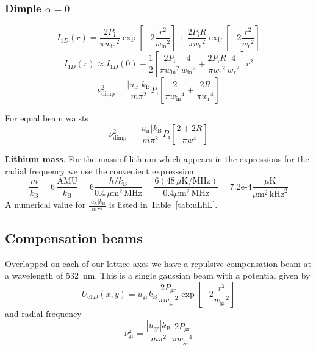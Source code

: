 \documentclass[11pt,letter]{article}
\newcommand{\pin}{\ensuremath{ P_{\text{i}}} }
\newcommand{\win}{\ensuremath{ w_{\text{in}}} }
\newcommand{\wret}{\ensuremath{ w_{\text{r}}} }
\newcommand{\pgr}{\ensuremath{ P_{\text{gr}}} }
\newcommand{\wgr}{\ensuremath{ w_{\text{gr}}} }
\begin{document}
\subsubsection{Dimple $\alpha=0$}

\begin{equation}
 I_{1D}(r) = 
  \frac{2 \pin}{\pi \win^{2}} 
  \exp\left[ -2 \frac{r^{2}}{\win^{2}} \right] 
 +\frac{2 \pin R}{\pi \wret^{2}} 
  \exp\left[ -2 \frac{r^{2}}{\wret^{2}} \right]
\end{equation}
\begin{equation}
I_{1D}(r) \approx I_{1D}(0)  - \frac{1}{2} 
  \left[ 
  \frac{2 \pin}{\pi \win^{2}} \frac{4}{\win^{2}} 
  + 
  \frac{2 \pin R}{\pi \wret^{2}} \frac{4}{\wret^{2}} 
\right] r^{2}
\end{equation}
\begin{equation}
 \nu_{\text{dimp}}^{2} 	= \frac{ |u_{\text{ir}}| k_{\text{B}}   }{m\pi^{2}}
 \pin  \left[ 
  \frac{2}{\pi \win^{4}} 
  + 
  \frac{2 R}{\pi \wret^{4}} 
\right]
\end{equation}

For equal beam waists 
\begin{equation}
 \nu_{\text{dimp}}^{2} 	= \frac{ |u_{\text{ir}}| k_{\text{B}}   }{m\pi^{2}}
 \pin  \left[ 
  \frac{2+2R}{\pi w^{4}} 
\right]
\end{equation}


{\bf Lithium mass}. 
For the mass of lithium which appears in the expressions for the radial
frequency we use the convenient expresssion 
\begin{equation}
  \frac{m}{ k_{\text{B}}}  = 6\,\frac{ \text{AMU} }{ k_{\text{B}}} 
    =  6 \frac{  h/k_{\text{B}} }{ 0.4 \,\mu\text{m}^{2}\,\text{MHz} }
   =  \frac{ 6  ( 48 \, \mu\text{K} / \text{MHz} ) }{ 0.4 \mu\text{m}^{2} \,\text{MHz} }  
    =  7.2\text{e-4}
    \frac { \mu\text{K} }{  \mu\text{m}^{2}\, \text{kHz}^{2} } 
\end{equation}
A numerical value for $\frac{ |u_{L}| k_{\text{B}} } { m \pi^{2}}$ is listed in
Table~\ref{tab:uLhL}.   
 

\subsection{Compensation beams}

Overlapped on each of our lattice axes we have a repulsive compensation beam at
a wavelength of 532~nm.  This is a single gaussian beam with a potential given
by  
\begin{equation}
  U_{\text{c}1D}( x,y) =   u_{\text{gr}}k_{\text{B}} \frac{2\pgr }{\pi \wgr^{2}} 
  \exp\left[ - 2 \frac{r^{2}}{ \wgr^{2}} \right] 
\end{equation}
and radial frequency
\begin{equation}
  \nu_{\text{gr}}^{2} =  
   \frac{ |u_{\text{gr}}| k_{\text{B}}   }{m\pi^{2}}
  \frac{2 \pgr}{\pi \wgr^{4}} 
\end{equation}
\end{document}
